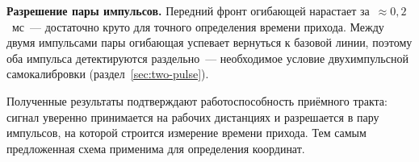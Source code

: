 \textbf{Разрешение пары импульсов.}
Передний фронт огибающей нарастает за~${\approx}0{,}2$~мс~--- достаточно круто для точного
определения времени прихода. Между двумя импульсами пары огибающая успевает вернуться к
базовой линии, поэтому оба импульса детектируются раздельно~--- необходимое условие
двухимпульсной самокалибровки (раздел~\ref{sec:two-pulse}).

Полученные результаты подтверждают работоспособность приёмного тракта: сигнал уверенно
принимается на рабочих дистанциях и разрешается в пару импульсов, на которой строится
измерение времени прихода. Тем самым предложенная схема применима для определения координат.

\FloatBarrier
